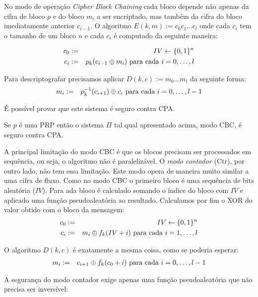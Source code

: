 No modo de operação {\em Cipher Block Chaining} cada bloco depende não apenas da cifra de bloco $p$ e do bloco $m_i$ a ser encriptado, mas também da cifra do bloco imediatamente anterior $c_{i-1}$.
O algoritmo $E(k,m) := c_0 c_1 \dots c_l$ onde cada $c_i$ tem o tamanho de um bloco $n$ e cada $c_i$ é computado da seguinte maneira:

\begin{eqnarray*}
  c_0 & := & IV \leftarrow \{0,1\}^n \\
  c_i & := & p_k(c_{i-1} \oplus m_i) \textrm{ para cada } i = 0, \dots, l
\end{eqnarray*}

Para descriptografar precisamos aplicar $D(k,c) := m_0 \dots m_l$ da seguinte forma:
\begin{eqnarray*}
  m_{i} & := & p_k^{-1}(c_{i+1}) \oplus c_{i} \textrm{ para cada } i = 0, \dots, l-1
\end{eqnarray*}

É possível provar que este sistema é seguro contra CPA.

\begin{theorem}
  Se $p$ é uma PRP então o sistema $\Pi$ tal qual apresentado acima, modo CBC, é seguro contra CPA.
\end{theorem}


A principal limitação do modo CBC é que os blocos precisam ser processados em sequência, ou seja, o algoritmo não é paralelizável.
O {\em modo contador} (Ctr), por outro lado, não tem essa limitação.
Este modo opera de maneira muito similar a uma cifra de fluxo.
Como no modo CBC o primeiro bloco é uma sequência de bits aleatória ($IV$).
Para ada bloco é calculado somando o índice do bloco com $IV$ e aplicado uma função pseudoaleatória ao resultado.
Calculamos por fim o XOR do valor obtido com o bloco da mensagem:
\begin{eqnarray*}
  c_0 & := & IV \leftarrow \{0,1\}^n \\
  c_i & := & m_i \oplus f_k(IV + i) \textrm{ para cada } i = 1, \dots, l
\end{eqnarray*} 

O algoritmo $D(k,c)$ é exatamente a mesma coisa, como se poderia esperar:
\begin{eqnarray*}
  m_i & := & c_{i+1} \oplus f_k(c_0 + i) \textrm{ para cada } i = 0, \dots, l-1
\end{eqnarray*} 

A segurança do modo contador exige apenas uma função pseudoaleatória que não precisa ser inversível:



